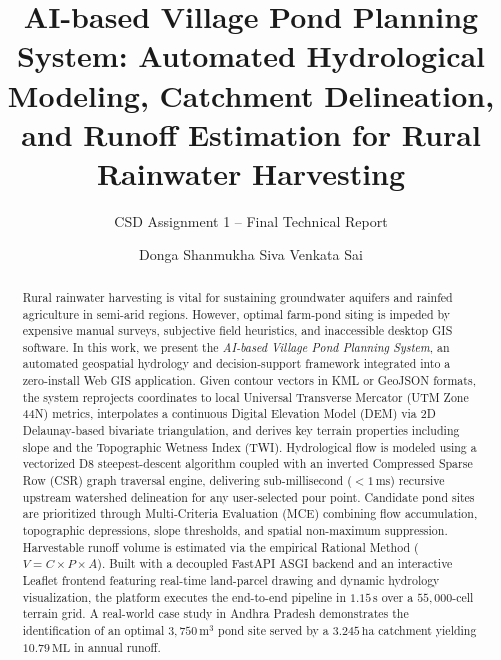 \documentclass[manuscript,screen,review]{acmart}
\begin{document}
\title{AI-based Village Pond Planning System: Automated Hydrological Modeling, Catchment Delineation, and Runoff Estimation for Rural Rainwater Harvesting}
\subtitle{CSD Assignment 1 -- Final Technical Report}

\author{Donga Shanmukha Siva Venkata Sai}

\renewcommand{\shortauthors}{D. S. S. V. Sai}

\begin{abstract}
Rural rainwater harvesting is vital for sustaining groundwater aquifers and rainfed agriculture in semi-arid regions. However, optimal farm-pond siting is impeded by expensive manual surveys, subjective field heuristics, and inaccessible desktop GIS software. In this work, we present the \emph{AI-based Village Pond Planning System}, an automated geospatial hydrology and decision-support framework integrated into a zero-install Web GIS application. Given contour vectors in KML or GeoJSON formats, the system reprojects coordinates to local Universal Transverse Mercator (UTM Zone 44N) metrics, interpolates a continuous Digital Elevation Model (DEM) via 2D Delaunay-based bivariate triangulation, and derives key terrain properties including slope and the Topographic Wetness Index (TWI). Hydrological flow is modeled using a vectorized D8 steepest-descent algorithm coupled with an inverted Compressed Sparse Row (CSR) graph traversal engine, delivering sub-millisecond ($<1\,\text{ms}$) recursive upstream watershed delineation for any user-selected pour point. Candidate pond sites are prioritized through Multi-Criteria Evaluation (MCE) combining flow accumulation, topographic depressions, slope thresholds, and spatial non-maximum suppression. Harvestable runoff volume is estimated via the empirical Rational Method ($V = C \times P \times A$). Built with a decoupled FastAPI ASGI backend and an interactive Leaflet frontend featuring real-time land-parcel drawing and dynamic hydrology visualization, the platform executes the end-to-end pipeline in $1.15\,\text{s}$ over a $55,000$-cell terrain grid. A real-world case study in Andhra Pradesh demonstrates the identification of an optimal $3,750\,\text{m}^3$ pond site served by a $3.245\,\text{ha}$ catchment yielding $10.79\,\text{ML}$ in annual runoff.
\end{abstract}
\end{document}
